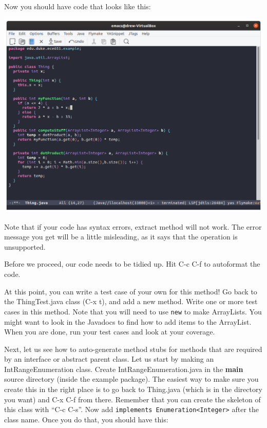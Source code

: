\documentclass[12pt]{article}
\begin{document}
Now you should have code that looks like this:

\begin{center}
  \includegraphics[width=5.5in]{emacs-em-post.png}
\end{center}

Note that if your code has syntax errors, extract method will not work.
The error message you get will be a little misleading, as it says that the
operation is unsupported.

Before we proceed, our code needs to be tidied up. Hit C-c C-f to autoformat
the code.

At this point, you can write a test case of your own for this method!
Go back to the ThingTest.java class (C-x t), and add a new method. Write
one or more test cases in this method.  Note that you will need to use
\verb+new+ to make ArrayLists.  You might want to look in the Javadocs
to find how to add items to the ArrayList. When you are done, run
your test cases and look at your coverage.

Next, let us see how to auto-generate method stubs for
methods that are required by an interface or abstract parent class.
Let us start by making an IntRangeEnumeration class.  Create
IntRangeEnumeration.java in the \textbf{main} source directory (inside
the example package).  The easiest way to make sure you create this in the
right place is to go back to Thing.java (which is in the directory you want)
and C-x C-f from there. Remember that you can create the skeleton
of this class with ``C-c C-s''.  
Now add \verb+implements Enumeration<Integer>+ after the class name.
Once you do that, you should have this:
\end{document}
